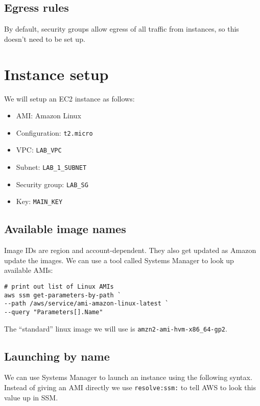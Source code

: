 \documentclass{pgnotes}
\begin{document}
\subsection{Egress rules}\label{egress-rules}

By default, security groups allow egress of all traffic from instances,
so this doesn't need to be set up.

\section{Instance setup}\label{instance-setup}

We will setup an EC2 instance as follows:

\begin{itemize}
\item
  AMI: Amazon Linux
\item
  Configuration: \texttt{t2.micro}
\item
  VPC: \texttt{LAB\_VPC}
\item
  Subnet: \texttt{LAB\_1\_SUBNET}
\item
  Security group: \texttt{LAB\_SG}
\item
  Key: \texttt{MAIN\_KEY}
\end{itemize}


\subsection{Available image names}\label{available-image-names}

Image IDs are region and account-dependent. They also get updated as
Amazon update the images.
We can use a tool called Systems Manager to look up available AMIs:

\begin{verbatim}
# print out list of Linux AMIs
aws ssm get-parameters-by-path `
--path /aws/service/ami-amazon-linux-latest `
--query "Parameters[].Name"
\end{verbatim}

The ``standard'' linux image we will use is \texttt{amzn2-ami-hvm-x86\_64-gp2}.

\subsection{Launching by name}\label{launching-by-name}

We can use Systems Manager to launch an instance using the following
syntax. Instead of giving an AMI directly we use \texttt{resolve:ssm:}
to tell AWS to look this value up in SSM.
\end{document}
